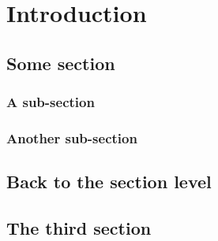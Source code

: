 \documentclass[12pt, oneside]{book}
\begin{document}
\chapter{Introduction}
\section{Some section}
\lipsum*[3-4]

\subsection{A sub-section}
\lipsum*[6-7]

\subsection{Another sub-section}
\lipsum*[10-11]

\section{Back to the section level}
\lipsum*[11-13]

\section{The third section}
\lipsum*[13-15]
\end{document}
